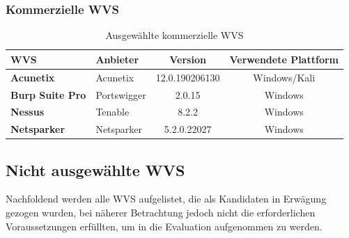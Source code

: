\documentclass[12pt,oneside,a4paper,parskip,pointlessnumbers]{scrbook}
\begin{document}
    \subsubsection{Kommerzielle WVS}
      \begin{table}[H]
        \centering
          \begin{tabular}{|p{4cm}|l|c|c|}
            \hline
            \textbf{WVS}            & \textbf{Anbieter} & \textbf{Version} & \textbf{Verwendete Plattform}  \\
            \hline
            \textbf{Acunetix}       & Acunetix          & 12.0.190206130   & Windows/Kali                          \\
            \hline
            \textbf{Burp Suite Pro} & Portswigger       & 2.0.15           & Windows                       \\
            \hline
            \textbf{Nessus}         & Tenable           & 8.2.2            & Windows                       \\
            \hline
            \textbf{Netsparker}     & Netsparker        & 5.2.0.22027      & Windows                       \\
            \hline
          \end{tabular}
        \caption[Ausgewählte kommerzielle WVS]{Ausgewählte kommerzielle WVS}
      \end{table}
\newpage
  \subsection{Nicht ausgewählte WVS}
    Nachfoldend werden alle WVS aufgelistet, die als Kandidaten in Erwägung gezogen wurden, bei näherer Betrachtung jedoch nicht die erforderlichen Voraussetzungen erfüllten, um in die Evaluation aufgenommen zu werden.
\end{document}
